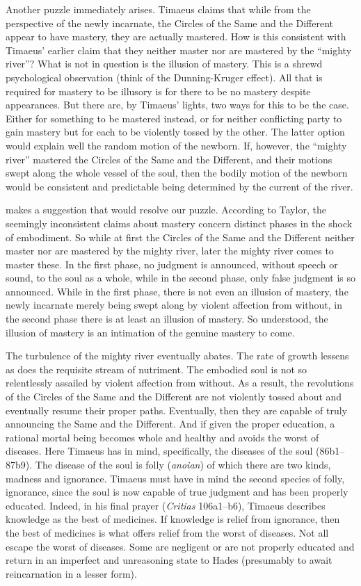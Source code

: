Another puzzle immediately arises. Timaeus claims that while from the perspective of the newly incarnate, the Circles of the Same and the Different appear to have mastery, they are actually mastered. How is this consistent with Timaeus' earlier claim that they neither master nor are mastered by the ``mighty river''? What is not in question is the illusion of mastery. This is a shrewd psychological observation (think of the Dunning-Kruger effect). All that is required for mastery to be illusory is for there to be no mastery despite appearances. But there are, by Timaeus' lights, two ways for this to be the case. Either for something to be mastered instead, or for neither conflicting party to gain mastery but for each to be violently tossed by the other. The latter option would explain well the random motion of the newborn. If, however, the ``mighty river'' mastered the Circles of the Same and the Different, and their motions swept along the whole vessel of the soul, then the bodily motion of the newborn would be consistent and predictable being determined by the current of the river. 

\citet[271]{Taylor:1928qb} makes a suggestion that would resolve our puzzle. According to Taylor, the seemingly inconsistent claims about mastery concern distinct phases in the shock of embodiment. So while at first the Circles of the Same and the Different neither master nor are mastered by the mighty river, later the mighty river comes to master these. In the first phase, no judgment is announced, without speech or sound, to the soul as a whole, while in the second phase, only false judgment is so announced. While in the first phase, there is not even an illusion of mastery, the newly incarnate merely being swept along by violent affection from without, in the second phase there is at least an illusion of mastery. So understood, the illusion of mastery is an intimation of the genuine mastery to come. 

The turbulence of the mighty river eventually abates. The rate of growth lessens as does the requisite stream of nutriment. The embodied soul is not so relentlessly assailed by violent affection from without. As a result, the revolutions of the Circles of the Same and the Different are not violently tossed about and eventually resume their proper paths. Eventually, then they are capable of truly announcing the Same and the Different. And if given the proper education, a rational mortal being becomes whole and healthy and avoids the worst of diseases. Here Timaeus has in mind, specifically, the diseases of the soul (86b1--87b9). The disease of the soul is folly (\emph{anoian}) of which there are two kinds, madness and ignorance. Timaeus must have in mind the second species of folly, ignorance, since the soul is now capable of true judgment and has been properly educated. Indeed, in his final prayer (\emph{Critias} 106a1–b6), Timaeus describes knowledge as the best of medicines. If knowledge is relief from ignorance, then the best of medicines is what offers relief from the worst of diseases. Not all escape the worst of diseases. Some are negligent or are not properly educated and return in an imperfect and unreasoning state to Hades (presumably to await reincarnation in a lesser form).

